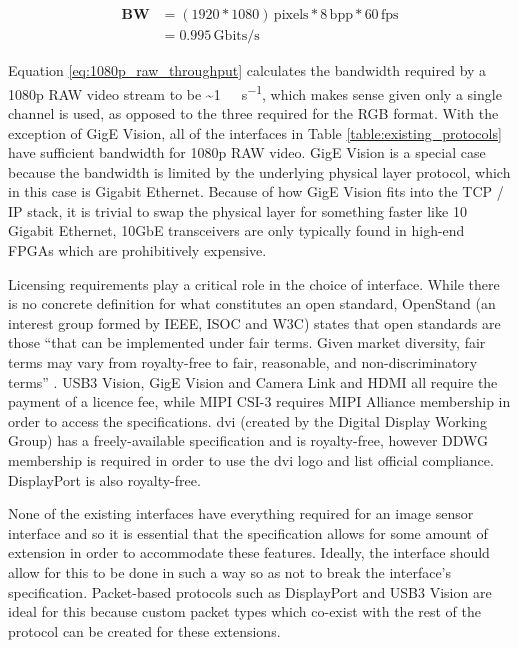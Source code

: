 \begin{equation}
  \begin{split}
    \mathbf{BW} &= (1920*1080) \, \mathrm{pixels} * 8  \, \mathrm{bpp} * 60 \, \mathrm{fps} \\
                &= 0.995  \, \mathrm{Gbits/s}
  \end{split}  
  \label{eq:1080p_raw_throughput}
\end{equation}

Equation \ref{eq:1080p_raw_throughput} calculates the bandwidth required by a 1080p RAW video stream to be \SI{~1}{\giga\bit\per\second}, which makes sense given only a single channel is used, as opposed to the three required for the RGB format. With the exception of GigE Vision, all of the interfaces in Table \ref{table:existing_protocols} have sufficient bandwidth for 1080p RAW video. GigE Vision is a special case because the bandwidth is limited by the underlying physical layer protocol, which in this case is Gigabit Ethernet. Because of how GigE Vision fits into the TCP / IP stack, it is trivial to swap the physical layer for something faster like 10 Gigabit Ethernet, 10GbE transceivers are only typically found in high-end FPGAs which are prohibitively expensive.

Licensing requirements play a critical role in the choice of interface. While there is no concrete definition for what constitutes an open standard, OpenStand (an interest group formed by IEEE, ISOC and W3C) states that open standards are those ``that can be implemented under fair terms. Given market diversity, fair terms may vary from royalty-free to fair, reasonable, and non-discriminatory terms'' \cite{open_standard_definition}. USB3 Vision, GigE Vision and Camera Link and HDMI all require the payment of a licence fee, while MIPI CSI-3 requires MIPI Alliance membership in order to access the specifications. \gls{dvi} (created by the Digital Display Working Group) has a freely-available specification and is royalty-free, however DDWG membership is required in order to use the \gls{dvi} logo and list official compliance. DisplayPort is also royalty-free.

None of the existing interfaces have everything required for an image sensor interface and so it is essential that the specification allows for some amount of extension in order to accommodate these features. Ideally, the interface should allow for this to be done in such a way so as not to break the interface's specification. Packet-based protocols such as DisplayPort and USB3 Vision are ideal for this because custom packet types which co-exist with the rest of the protocol can be created for these extensions.

